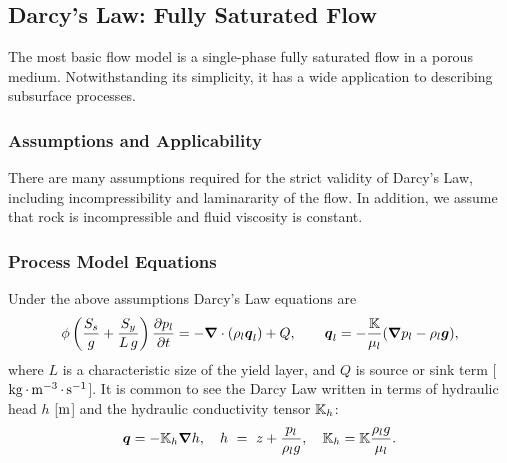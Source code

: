 
\subsection{Darcy's Law: Fully Saturated Flow}
\label{sec:flow-single-phase}

The most basic flow model is a single-phase fully saturated flow in a porous medium.  
Notwithstanding its simplicity, it has a wide application to
describing subsurface processes.


\subsubsection{Assumptions and Applicability}

There are many assumptions required for the strict validity of Darcy's Law, 
including incompressibility and laminararity of the flow.
In addition, we  assume that rock is incompressible and fluid viscosity is constant.


\subsubsection{Process Model Equations}

Under the above assumptions Darcy's Law equations are
\begin{equation}
  \phi \left(\displaystyle \frac{S_s}{g} + \displaystyle \frac{S_y}{L\,g}\right) \frac{\partial p_l}{\partial t} 
  =
  -\boldsymbol{\nabla} \cdot (\rho_l \boldsymbol{q}_l) + Q,
  \qquad
  {\boldsymbol{q}}_l = -\frac{{\mathbb K}}{\mu_l} 
  ({\boldsymbol{\nabla}} p_l - \rho_l {\boldsymbol{g}}),
\end{equation}
where $L$ is a characteristic size of the yield layer, and 
$Q$ is source or sink term [${\rm kg} {\,\cdot\,} {\rm m}^{-3} {\,\cdot\,} {\rm s}^{-1}$].
It is common to see the Darcy Law written in terms of hydraulic head $h$ [${\rm m}$]
and the hydraulic conductivity tensor ${\mathbb K}_h$:
\begin{equation}  \label{eq:HydraulicHead}
  {\boldsymbol{q}} = -{\mathbb K}_h {\boldsymbol{\nabla}} h,\quad
  h \ =\   z + \frac{p_l}{\rho_l g},\quad
  {\mathbb K}_h = {\mathbb K} \frac{\rho_l g}{\mu_l}.
\end{equation}

